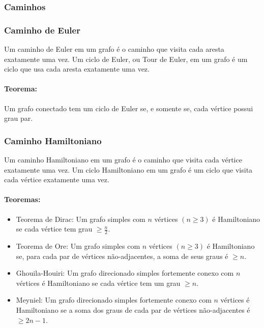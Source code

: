 \subsubsection{Caminhos}
\subsubsection*{Caminho de Euler} 
Um caminho de Euler em um grafo é o caminho que visita cada aresta exatamente uma vez. Um ciclo de Euler, ou Tour de Euler, em um grafo é um ciclo que usa cada aresta exatamente uma vez.

\paragraph{Teorema:} Um grafo conectado tem um ciclo de Euler se, e somente se, cada vértice possui grau par.

\subsubsection*{Caminho Hamiltoniano} 
Um caminho Hamiltoniano em um grafo é o caminho que visita cada vértice exatamente uma vez. Um ciclo Hamiltoniano em um grafo é um ciclo que visita cada vértice exatamente uma vez.

\paragraph{Teoremas:} \empty
\begin{itemize}
    \item Teorema de Dirac: Um grafo simples com $n$ vértices $(n\ge 3)$ é Hamiltoniano se cada vértice tem grau $ \ge \frac{n}{2}$.
    \item Teorema de Ore: Um grafo simples com $n$ vértices $(n\ge 3)$ é Hamiltoniano se, para cada par de vértices não-adjacentes, a soma de seus graus é $\ge n$.
    \item Ghouila-Houiri: Um grafo direcionado simples fortemente conexo com $n$ vértices é Hamiltoniano se cada vértice tem um grau $\ge n$.
    \item Meyniel: Um grafo direcionado simples fortemente conexo com $n$ vértices é Hamiltoniano se a soma dos graus de cada par de vértices não-adjacentes é $\ge 2n-1$.
\end{itemize}